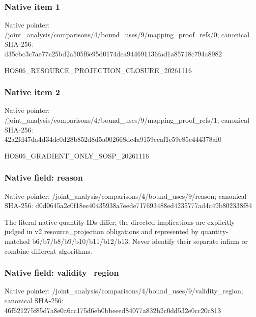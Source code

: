 \documentclass[10pt,a4paper]{article}
\begin{document}
\subsubsection{Native item 1}
Native pointer: /joint\_\allowbreak{}analysis/comparisons/4/bound\_\allowbreak{}uses/9/mapping\_\allowbreak{}proof\_\allowbreak{}refs/0; canonical SHA-256: d35cbc3c7ae77c25bd2a505f6e95d0174dca944691136fad1a85718c794a8982

\begingroup\raggedright\sloppy HOS06\_\allowbreak{}RESOURCE\_\allowbreak{}PROJECTION\_\allowbreak{}CLOSURE\_\allowbreak{}20261116\par\endgroup

\subsubsection{Native item 2}
Native pointer: /joint\_\allowbreak{}analysis/comparisons/4/bound\_\allowbreak{}uses/9/mapping\_\allowbreak{}proof\_\allowbreak{}refs/1; canonical SHA-256: 42a2fd47da4d34dc0d28b852d8d5a002668dc4a9159ccaf1e59c85c444378af0

\begingroup\raggedright\sloppy HOS06\_\allowbreak{}GRADIENT\_\allowbreak{}ONLY\_\allowbreak{}SOSP\_\allowbreak{}20261116\par\endgroup

\subsubsection{Native field: reason}
Native pointer: /joint\_\allowbreak{}analysis/comparisons/4/bound\_\allowbreak{}uses/9/reason; canonical SHA-256: d0d0645a2c0f18ee40435938a7eede717693488ed4235777ad4c49b802338f84

\begingroup\raggedright\sloppy The literal native quantity IDs differ;\allowbreak{} the directed implications are explicitly judged in v2 resource\_\allowbreak{}projection obligations and represented by quantity-matched b6/\allowbreak{}b7/\allowbreak{}b8/\allowbreak{}b9/\allowbreak{}b10/\allowbreak{}b11/\allowbreak{}b12/\allowbreak{}b13. Never identify their separate infima or combine different algorithms.\par\endgroup

\subsubsection{Native field: validity\_\allowbreak{}region}
Native pointer: /joint\_\allowbreak{}analysis/comparisons/4/bound\_\allowbreak{}uses/9/validity\_\allowbreak{}region; canonical SHA-256: 46f621275f85d7a8e0a6cc175d6eb0bbeeed84077a832b2c0dd532e0cc20c813
\end{document}
